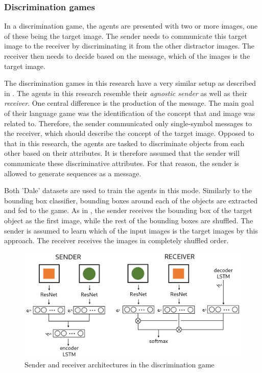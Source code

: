
\subsubsection{Discrimination games}
In a discrimination game, the agents are presented with two or more images, one of these being the target image.
The sender needs to communicate this target image to the receiver by discriminating it from the other distractor images.
The receiver then needs to decide based on the message, which of the images is the target image.

The discrimination games in this research have a very similar setup as described in \citet{Lazaridou2016}.
The agents in this research resemble their \emph{agnostic sender} as well as their \emph{receiver}.
One central difference is the production of the message.
The main goal of their language game was the identification of the concept that and image was related to.
Therefore, the sender communicated only single-symbol messages to the receiver, which should describe the concept of the target image.
Opposed to that in this research, the agents are tasked to discriminate objects from each other based on their attributes.
It is therefore assumed that the sender will communicate these discriminative attributes.
For that reason, the sender is allowed to generate sequences as a message.

Both 'Dale' datasets are used to train the agents in this mode.
Similarly to the bounding box classifier, bounding boxes around each of the objects are extracted and fed to the game.
As in \citet{Lazaridou2016}, the sender receives the bounding box of the target object as the first image, while the rest of the bounding boxes are shuffled.
The sender is assumed to learn which of the input images is the target images by this approach.
The receiver receives the images in completely shuffled order.

\begin{figure}[h]
    \centering
    \includegraphics[width=.8\linewidth]{figures/arch_discriminator.png}
    \caption{Sender and receiver architectures in the discrimination game}
    \label{fig:discriminator_architecture}
\end{figure}


